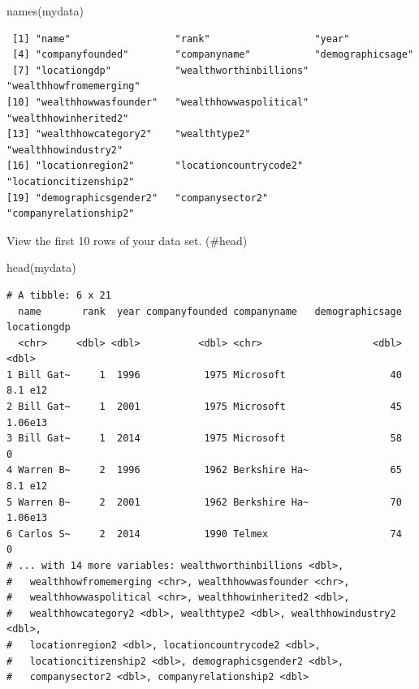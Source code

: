 \documentclass[
]{book}
\newenvironment{Shaded}{\begin{snugshade}}{\end{snugshade}}
\newcommand{\FunctionTok}[1]{\textcolor[rgb]{0.00,0.00,0.00}{#1}}
\newcommand{\NormalTok}[1]{#1}
\begin{document}
\begin{Shaded}
\begin{Highlighting}[]
\FunctionTok{names}\NormalTok{(mydata)}
\end{Highlighting}
\end{Shaded}

\begin{verbatim}
 [1] "name"                  "rank"                  "year"                 
 [4] "companyfounded"        "companyname"           "demographicsage"      
 [7] "locationgdp"           "wealthworthinbillions" "wealthhowfromemerging"
[10] "wealthhowwasfounder"   "wealthhowwaspolitical" "wealthhowinherited2"  
[13] "wealthhowcategory2"    "wealthtype2"           "wealthhowindustry2"   
[16] "locationregion2"       "locationcountrycode2"  "locationcitizenship2" 
[19] "demographicsgender2"   "companysector2"        "companyrelationship2" 
\end{verbatim}

View the first 10 rows of your data set. (\#head)

\begin{Shaded}
\begin{Highlighting}[]
\FunctionTok{head}\NormalTok{(mydata)}
\end{Highlighting}
\end{Shaded}

\begin{verbatim}
# A tibble: 6 x 21
  name       rank  year companyfounded companyname   demographicsage locationgdp
  <chr>     <dbl> <dbl>          <dbl> <chr>                   <dbl>       <dbl>
1 Bill Gat~     1  1996           1975 Microsoft                  40     8.1 e12
2 Bill Gat~     1  2001           1975 Microsoft                  45     1.06e13
3 Bill Gat~     1  2014           1975 Microsoft                  58     0      
4 Warren B~     2  1996           1962 Berkshire Ha~              65     8.1 e12
5 Warren B~     2  2001           1962 Berkshire Ha~              70     1.06e13
6 Carlos S~     2  2014           1990 Telmex                     74     0      
# ... with 14 more variables: wealthworthinbillions <dbl>,
#   wealthhowfromemerging <chr>, wealthhowwasfounder <chr>,
#   wealthhowwaspolitical <chr>, wealthhowinherited2 <dbl>,
#   wealthhowcategory2 <dbl>, wealthtype2 <dbl>, wealthhowindustry2 <dbl>,
#   locationregion2 <dbl>, locationcountrycode2 <dbl>,
#   locationcitizenship2 <dbl>, demographicsgender2 <dbl>,
#   companysector2 <dbl>, companyrelationship2 <dbl>
\end{verbatim}
\end{document}
